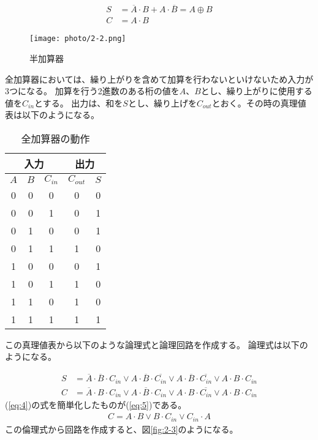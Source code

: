 \documentclass[dvipdfmx]{jsarticle}
\begin{document}
\begin{align}
  S &= \overline{A} \cdot B + A \cdot \overline{B} = A \oplus B \label{eq:1}\\
  C &= A \cdot B \label{eq:2}
\end{align}

\begin{figure}
  \begin{center}
    \texttt{[image: photo/2-2.png]}
  \end{center}
  \caption{半加算器}
  \label{fig:2-2}
\end{figure}

全加算器においては、繰り上がりを含めて加算を行わないといけないため入力が3つになる。
加算を行う2進数のある桁の値を$A$、$B$とし、繰り上がりに使用する値を$C_{in}$とする。
出力は、和を$S$とし、繰り上げを$C_{out}$とおく。その時の真理値表は以下のようになる。

\begin{table}[hbtp]
  \caption{全加算器の動作}
  \centering
  \begin{tabular}{|c|c|c||c|c|} \hline
    \multicolumn{3}{|c||}{入力} & \multicolumn{2}{c|}{出力} \\ \hline
    $A$ & $B$ & $C_{in}$ & $C_{out}$ & $S$ \\ \hline
    0 & 0 & 0 & 0 & 0 \\ \hline
    0 & 0 & 1 & 0 & 1 \\ \hline
    0 & 1 & 0 & 0 & 1 \\ \hline
    0 & 1 & 1 & 1 & 0 \\ \hline
    1 & 0 & 0 & 0 & 1 \\ \hline
    1 & 0 & 1 & 1 & 0 \\ \hline
    1 & 1 & 0 & 1 & 0 \\ \hline
    1 & 1 & 1 & 1 & 1 \\ \hline
  \end{tabular}
  \label{tb:table10}
\end{table}

この真理値表から以下のような論理式と論理回路を作成する。
論理式は以下のようになる。

\begin{align}
  S &= \overline{A} \cdot \overline{B} \cdot C_{in} \vee A \cdot \overline{B} \cdot \overline{C_{in}} \vee A \cdot \overline{B} \cdot \overline{C_{in}} \vee A \cdot B \cdot C_{in} \label{eq:3}\\
  C &= \overline{A} \cdot B \cdot C_{in} \vee A \cdot \overline{B} \cdot C_{in} \vee A \cdot B \cdot \overline{C_{in}} \vee A \cdot B \cdot C_{in} \label{eq:4}
\end{align}
(\ref*{eq:4})の式を簡単化したものが(\ref*{eq:5})である。
\begin{align}
  C = A \cdot B \vee B \cdot C_{in} \vee C_{in} \cdot A \label{eq:5}
\end{align}
この倫理式から回路を作成すると、図\ref*{fig:2-3}のようになる。
\end{document}
